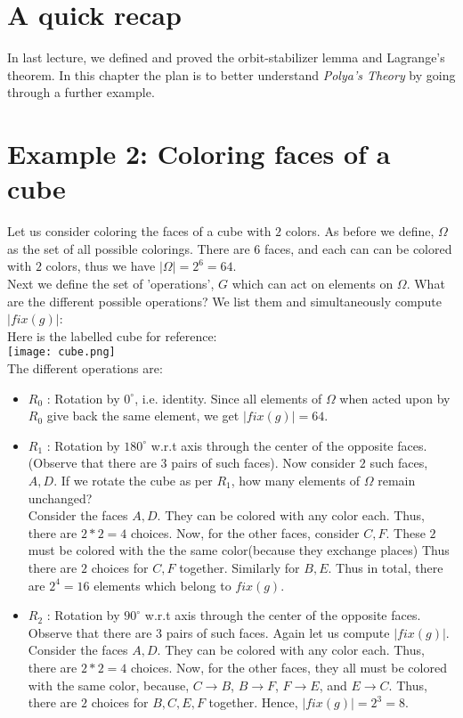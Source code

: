{
\section{A quick recap}
 In last lecture, we defined and proved the orbit-stabilizer lemma and Lagrange's theorem. In this chapter the plan is to better understand \emph{Polya's Theory} by going through a further example. 

\section{Example 2: Coloring faces of a cube}
Let us consider coloring the faces of a cube with $2$ colors. As before we define, $\Omega$ as the set of all possible colorings. There are $6$ faces, and each can can be colored with $2$ colors, thus we have $|\Omega| = 2^6 = 64$.
\\
Next we define the set of 'operations', $G$ which can act on elements on $\Omega$. What are the different possible operations? We list them and simultaneously compute $|fix(g)|$:
\\
Here is the labelled cube for reference:
\\
\texttt{[image: cube.png]}
\\
The different operations are:
\begin{itemize}
\item $R_0$ : Rotation by $0^{\circ}$, i.e. identity. Since all elements of $\Omega$ when acted upon by $R_0$ give back the same element, we get $|fix(g)| = 64$.

\item $R_1$ : Rotation by $180^{\circ}$ w.r.t axis through the center of the opposite faces. (Observe that there are $3$ pairs of such faces). Now consider $2$ such faces, $A, D$. If we rotate the cube as per $R_1$, how many elements of $\Omega$ remain unchanged? 
\\
Consider the faces $A, D$. They can be colored with any color each. Thus, there are $2*2 = 4$ choices. Now, for the other faces, consider $C, F$. These $2$ must be colored with the the same color(because they exchange places) Thus there are $2$ choices for $C, F$ together. Similarly for $B, E$. Thus in total, there are $2^4 = 16$ elements which belong to $fix(g)$.

\item $R_2$ : Rotation by $90^{\circ}$ w.r.t axis through the center of the opposite faces. Observe that there are $3$ pairs of such faces. Again let us compute $|fix(g)|$.
\\
Consider the faces $A, D$. They can be colored with any color each. Thus, there are $2*2 = 4$ choices. Now, for the other faces, they all must be colored with the same color, because, $C \rightarrow B$, $B \rightarrow F$, $F \rightarrow E$, and $E \rightarrow C$. Thus, there are $2$ choices for $B, C, E, F$ together. Hence, $|fix(g)| = 2^3 = 8$.


\end{itemize}}
